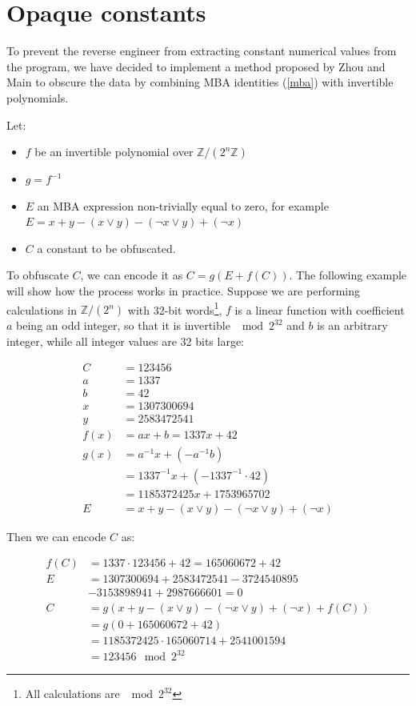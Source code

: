 \documentclass[
  digital, %
  notable,   %
  twoside, %
  nolof,     %
  nolot,     %
]{fithesis3}
\theoremstyle{definition}
\begin{document}
\section{Opaque constants} \label{obf_const}

To prevent the reverse engineer from extracting constant numerical values from the program, we have decided to implement a method proposed by Zhou and Main \cite{mba_zhou} to obscure the data by combining MBA identities (\ref{mba}) with invertible polynomials. 

Let:

\begin{itemize}
    \item $f$ be an invertible polynomial over $\mathbb{Z}/(2^n\mathbb{Z})$
    \item $g = f^{-1}$
    \item $E$ an MBA expression non-trivially equal to zero, for example $E = x + y - (x \vee y)-(\neg x \vee y)+(\neg x)$
    \item $C$ a constant to be obfuscated.
\end{itemize}

To obfuscate $C$, we can encode it as $C = g(E + f(C))$. The following example will show how the process works in practice. Suppose we are performing calculations in $\mathbb{Z}/(2^n)$ with 32-bit words\footnote{All calculations are $\mod 2^{32}$}, $f$ is a linear function with coefficient $a$ being an odd integer, so that it is invertible $\mod 2^{32}$ and $b$ is an arbitrary integer, while all integer values are 32 bits large:

\begin{align*}
C & = 123456 \\
a &= 1337 \\
b &= 42\\
x &= 1307300694 \\
y &= 2583472541 \\
f(x) &= ax + b = 1337x + 42\\
g(x) &= a^{-1}x + (-a^{-1}b) \\
&= 1337^{-1}x + (-1337^{-1}\cdot 42) 
\\&= 1185372425x + 1753965702 \\
E &= x + y - (x \vee y)-(\neg x \vee y)+(\neg x)
\end{align*}

Then we can encode $C$ as:

\begin{align*}
    f(C) &= 1337\cdot 123456 + 42 = 165060672 + 42 \\
    E &= 1307300694 + 2583472541 - 3724540895\\& - 3153898941 + 2987666601 = 0 \\
    C &= g(x + y - (x \vee y)-(\neg x \vee y)+(\neg x) + f(C)) \\
    &= g(0 + 165060672 + 42) \\
    &= 1185372425\cdot165060714 + 2541001594\\
    &= 123456 \mod 2^{32}
\end{align*}
\end{document}

